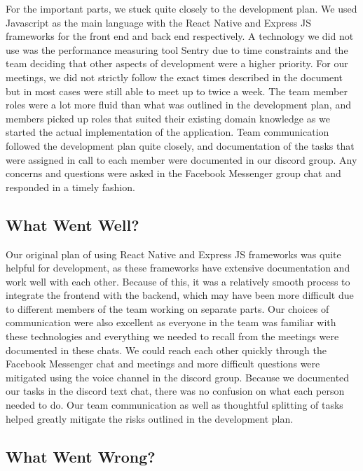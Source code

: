 \documentclass{article}
\begin{document}
For the important parts, we stuck quite closely to the development plan. We used Javascript as the main language with the React Native and Express JS frameworks for the front end and back end respectively. A technology we did not use was the performance measuring tool Sentry due to time constraints and the team deciding that other aspects of development were a higher priority. For our meetings, we did not strictly follow the exact times described in the document but in most cases were still able to meet up to twice a week. The team member roles were a lot more fluid than what was outlined in the development plan, and members picked up roles that suited their existing domain knowledge as we started the actual implementation of the application. Team communication followed the development plan quite closely, and documentation of the tasks that were assigned in call to each member were documented in our discord group. Any concerns and questions were asked in the Facebook Messenger group chat and responded in a timely fashion. 

\subsection{What Went Well?}


Our original plan of using React Native and Express JS frameworks was quite helpful for development, as these frameworks have extensive documentation and work well with each other. Because of this, it was a relatively smooth process to integrate the frontend with the backend, which may have been more difficult due to different members of the team working on separate parts. Our choices of communication were also excellent as everyone in the team was familiar with these technologies and everything we needed to recall from the meetings were documented in these chats. We could reach each other quickly through the Facebook Messenger chat and meetings and more difficult questions were mitigated using the voice channel in the discord group. Because we documented our tasks in the discord text chat, there was no confusion on what each person needed to do. Our team communication as well as thoughtful splitting of tasks helped greatly mitigate the risks outlined in the development plan.

\subsection{What Went Wrong?}
\end{document}
